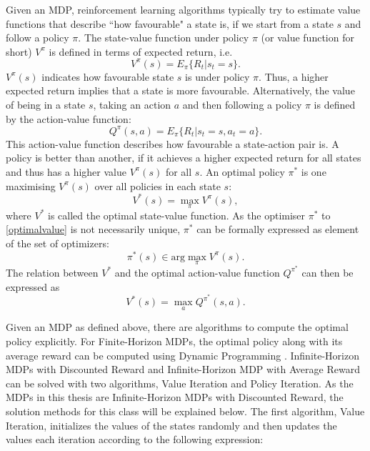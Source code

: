 \documentclass[../main.tex]{subfiles}
\begin{document}
Given an MDP, reinforcement learning algorithms typically try to estimate value functions that describe ``how favourable" a state is, if we start from a state $s$ and follow a policy $\pi$. The state-value function under policy $\pi$ (or value function for short) $V^\pi$ is defined in terms of expected return, i.e.
\begin{equation}
V^\pi(s) = E_\pi\{R_t|s_t = s\}.
\end{equation}
$V^\pi(s)$ indicates how favourable state $s$ is under policy $\pi$. Thus, a higher expected return implies that a state is more favourable. Alternatively, the value of being in a state $s$, taking an action $a$ and then following a policy $\pi$ is defined by the action-value function:
\begin{equation}
Q^\pi(s,a) = E_\pi\{R_t|s_t = s, a_t = a\}.
\end{equation}
This action-value function describes how favourable a state-action pair is. A policy is better than another, if it achieves a higher expected return for all states and thus has a higher value $V^\pi(s)$ for all $s$. An optimal policy $\pi^*$ is one maximising $V^\pi(s)$ over all policies in each state $s$:
\begin{equation}\label{optimalvalue}
V^*(s) = \max_\pi V^\pi(s),
\end{equation}
where $V^*$ is called the optimal state-value function. As the optimiser $\pi^*$ to \eqref{optimalvalue} is not necessarily unique, $\pi^*$ can be formally expressed as element of the set of optimizers:
\begin{equation}
\pi^*(s) \in \text{arg}\max_\pi V^\pi(s).
\end{equation}
The relation between $V^*$ and the optimal action-value function $Q^{\pi^*}$ can then be expressed as 
\begin{equation}
    V^*(s) = \max_a Q^{\pi^*}(s,a).
\end{equation}
\par
Given an MDP as defined above, there are algorithms to compute the optimal policy explicitly. For Finite-Horizon MDPs, the optimal policy along with its average reward can be computed using Dynamic Programming \cite{bellman2013dynamic}. Infinite-Horizon MDPs with Discounted Reward and Infinite-Horizon MDP with Average Reward can be solved with two algorithms, Value Iteration and Policy Iteration. As the MDPs in this thesis are Infinite-Horizon MDPs with Discounted Reward, the solution methods for this class will be explained below.
The first algorithm, Value Iteration, initializes the values of the states randomly and then updates the values each iteration according to the following expression:
\end{document}
